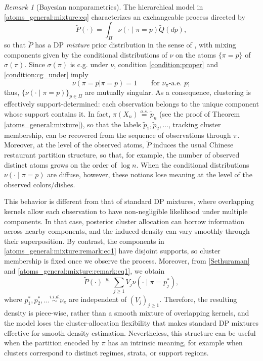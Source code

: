 \documentclass[a4paper]{article}
\theoremstyle{plain}
\theoremstyle{remark}
\newtheorem{remark}[theorem]{Remark}
\theoremstyle{definition}
\begin{document}
\begin{remark}[Bayesian nonparametrics]\label{atoms_general:mixture:remark}
The hierarchical model in \eqref{atoms_general:mixture:eq} characterizes an exchangeable process directed by
\begin{equation}\label{atoms_general:mixture:remark:eq1}
\tilde{P}(\cdot)=\int_\Pi\nu(\cdot\mid\pi=p)\tilde{Q}(dp),
\end{equation}
so that $\tilde{P}$ has a DP \textit{mixture} prior distribution in the sense of \citep{lo1984}, with mixing components given by the conditional distributions of $\nu$ on the atoms $\{\pi=p\}$ of $\sigma(\pi)$. Since $\sigma(\pi)$ is c.g. under $\nu$, condition \eqref{condition:proper} and \eqref{condition:cg_under} imply
\[\nu(\pi=p|\pi=p)=1\qquad\mbox{for }\nu_\pi\mbox{-a.e. }p;\]
thus, $\{\nu(\cdot\mid\pi=p)\}_{p\in\Pi}$ are mutually singular. As a consequence, clustering is effectively support-determined: each observation belongs to the unique component whose support contains it. In fact, $\pi(X_n)\overset{a.s.}{=}\tilde p_n$ (see the proof of Theorem \ref{atoms_general:mixture}), so that the labels $\tilde{p}_1,\tilde{p}_2,\ldots$, tracking cluster membership, can be recovered from the sequence of observations through $\pi$. Moreover, at the level of the observed atoms, $\tilde{P}$ induces the usual Chinese restaurant partition structure, so that, for example, the number of observed distinct atoms grows on the order of $\log n$. When the conditional distributions $\nu(\cdot\mid\pi=p)$ are diffuse, however, these notions lose meaning at the level of the observed colors/dishes.

This behavior is different from that of standard DP mixtures, where overlapping kernels allow each observation to have non-negligible likelihood under multiple components. In that case, posterior cluster allocation can borrow information across nearby components, and the induced density can vary smoothly through their superposition. By contrast, the components in \eqref{atoms_general:mixture:remark:eq1} have disjoint supports, so cluster membership is fixed once we observe the process. Moreover, from \eqref{Sethuraman} and \eqref{atoms_general:mixture:remark:eq1}, we obtain
\[\tilde{P}(\cdot)\overset{w}{=}\sum_{j\geq1}V_j\nu(\cdot\mid\pi=p^*_j),\]
where $p_1^*,p^*_2,\ldots\overset{i.i.d.}{\sim}\nu_\pi$ are independent of $(V_j)_{j\geq1}$. Therefore, the resulting density is piece-wise, rather than a smooth mixture of overlapping kernels, and the model loses the cluster-allocation flexibility that makes standard DP mixtures effective for smooth density estimation. Nevertheless, this structure can be useful when the partition encoded by $\pi$ has an intrinsic meaning, for example when clusters correspond to distinct regimes, strata, or support regions.


\end{remark}
\end{document}
